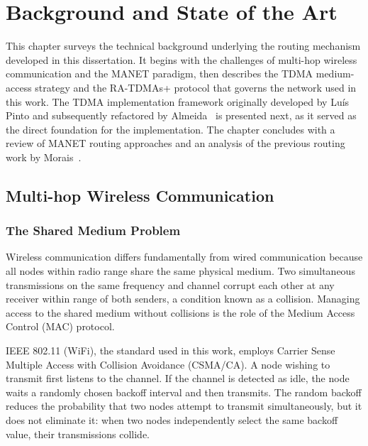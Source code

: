 
\chapter{Background and State of the Art}
\label{chap:background}

This chapter surveys the technical background underlying the routing mechanism
developed in this dissertation. It begins with the challenges of multi-hop
wireless communication and the MANET paradigm, then describes the TDMA
medium-access strategy and the RA-TDMAs+ protocol that governs the network
used in this work. The TDMA implementation framework originally developed by Luís Pinto and
subsequently refactored by Almeida~\cite{almeida2023synchronization} is
presented next, as it served as the direct foundation for the implementation. The chapter concludes with a
review of MANET routing approaches and an analysis of the previous routing
work by Morais~\cite{morais2024synchronization}.


\section{Multi-hop Wireless Communication}
\label{sec:wireless}

\subsection{The Shared Medium Problem}

Wireless communication differs fundamentally from wired communication because
all nodes within radio range share the same physical medium. Two simultaneous
transmissions on the same frequency and channel corrupt each other at any
receiver within range of both senders, a condition known as a collision.
Managing access to the shared medium without collisions is the role of the
Medium Access Control (MAC) protocol.

IEEE 802.11 (WiFi), the standard used in this work, employs Carrier Sense
Multiple Access with Collision Avoidance (CSMA/CA). A node wishing to
transmit first listens to the channel. If the channel is detected as idle,
the node waits a randomly chosen backoff interval and then transmits. The
random backoff reduces the probability that two nodes attempt to transmit
simultaneously, but it does not eliminate it: when two nodes independently
select the same backoff value, their transmissions collide.

